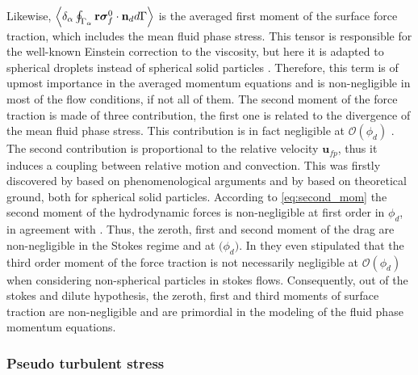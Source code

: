 Likewise, $\left<\delta_\alpha \oint_{\Gamma_\alpha} \textbf{r}\bm{\sigma}_f^0 \cdot \textbf{n}_d d\Gamma\right>$ is the averaged first moment of the surface force traction, which includes the mean fluid phase stress. 
This tensor is responsible for the well-known Einstein correction to the viscosity, but here it is adapted to spherical droplets instead of spherical solid particles \citep{rallison1978note}. 
Therefore, this term is of upmost importance in the averaged momentum equations and is non-negligible in most of the flow conditions, if not all of them.
The second moment of the force traction is made of three contribution, the first one is related to the divergence of the mean fluid phase stress. 
This contribution is in fact negligible at $\mathcal{O}(\phi_d)$ \citep{jackson1997locally}.  
The second contribution is proportional to the relative velocity $\textbf{u}_{fp}$, thus it induces a coupling between relative motion and convection. 
This was firstly discovered by \citet{nozieres1987local} based on phenomenological arguments and by \citet{lhuillier1992volume} based on theoretical ground, both for spherical solid particles. 
According to \ref{eq:second_mom} the second moment of the hydrodynamic forces is non-negligible at first order in $\phi_d$, in agreement with \citep{jackson1997locally,zhang1997momentum}. 
Thus, the zeroth, first and second moment of the drag are non-negligible in the Stokes regime and at $\mathcal(\phi_d)$. 
In \citet{zhang1997momentum} they even stipulated that the third order moment of the force traction is not necessarily negligible at $\mathcal{O}(\phi_d)$ when considering non-spherical particles in stokes flows. 
Consequently, out of the stokes and dilute hypothesis, the zeroth, first and third moments of surface traction are non-negligible and are primordial in the modeling of the fluid phase momentum equations. 

\subsubsection{Pseudo turbulent stress}

